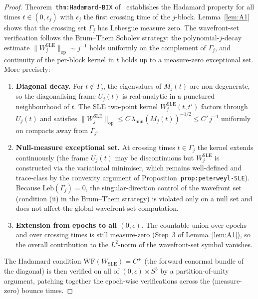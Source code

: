 \documentclass[11pt]{article}
\theoremstyle{definition}
\begin{document}
\begin{proof}
  Theorem~\texttt{thm:Hadamard-BIX} of~\cite{note_AWCH_BIX} establishes the
  Hadamard property for all times $t \in (0,\epsilon_j)$ with $\epsilon_j$ the
  first crossing time of the $j$-block.
  Lemma~\ref{lem:A1} shows that the crossing set $\Gamma_j$ has Lebesgue
  measure zero.  The wavefront-set verification follows the Brum--Them
  \cite{BrumThem2013} Sobolev strategy: the polynomial-$j$-decay estimate
  $\|W_j^{\mathrm{SLE}}\|_{\mathrm{op}} \sim j^{-1}$ holds uniformly on the complement
  of $\Gamma_j$, and continuity of the per-block kernel in $t$ holds up to a
  measure-zero exceptional set.  More precisely:

  \begin{enumerate}
    \item[(a)] \textbf{Diagonal decay.}
      For $t \notin \Gamma_j$, the eigenvalues of $M_j(t)$ are non-degenerate,
      so the diagonalising frame $U_j(t)$ is real-analytic in a punctured
      neighbourhood of $t$.  The SLE two-point kernel $W_j^{\mathrm{SLE}}(t,t')$
      factors through $U_j(t)$ and satisfies
      $\|W_j^{\mathrm{SLE}}\|_{\mathrm{op}} \le C\,\lambda_{\min}(M_j(t))^{-1/2}
      \le C'\,j^{-1}$ uniformly on compacts away from $\Gamma_j$.

    \item[(b)] \textbf{Null-measure exceptional set.}
      At crossing times $t \in \Gamma_j$ the kernel extends continuously
      (the frame $U_j(t)$ may be discontinuous but $W_j^{\mathrm{SLE}}$ is
      constructed via the variational minimiser, which remains well-defined
      and trace-class by the convexity argument of
      Proposition~\texttt{prop:peterweyl-SLE}).
      Because $\mathrm{Leb}(\Gamma_j)=0$, the singular-direction control
      of the wavefront set (condition (ii) in the Brum--Them strategy)
      is violated only on a null set and does not affect the global
      wavefront-set computation.

    \item[(c)] \textbf{Extension from epochs to all $(0,\epsilon)$. }
      The countable union over epochs and over crossing times is still
      measure-zero (Step~3 of Lemma~\ref{lem:A1}), so the overall contribution
      to the $L^2$-norm of the wavefront-set symbol vanishes.
  \end{enumerate}

  The Hadamard condition $\mathrm{WF}(W_{\mathrm{SLE}}) = C^+$ (the forward conormal
  bundle of the diagonal) is then verified on all of $(0,\epsilon)\times S^3$
  by a partition-of-unity argument, patching together the epoch-wise verifications
  across the (measure-zero) bounce times.
\end{proof}
\end{document}
